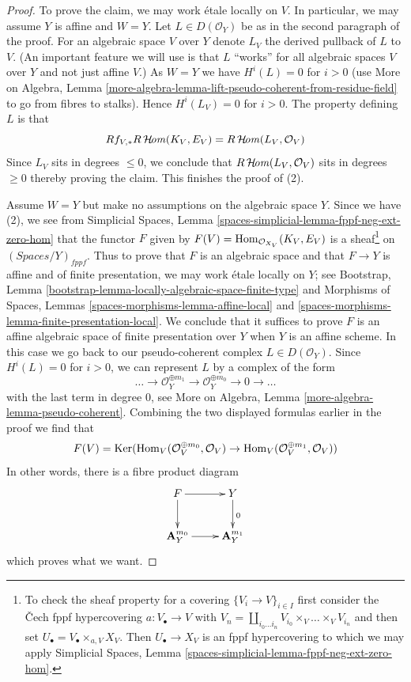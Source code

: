 \begin{proof}
\medskip\noindent
To prove the claim, we may work \'etale locally on $V$.
In particular, we may assume $Y$ is affine and $W = Y$.
Let $L \in D(\mathcal{O}_Y)$ be as in the second paragraph of the proof.
For an algebraic space $V$ over $Y$ denote $L_V$ the derived pullback of
$L$ to $V$. (An important feature we will use is that $L$ ``works'' for all
algebraic spaces $V$ over $Y$ and not just affine $V$.)
As $W = Y$ we have $H^i(L) = 0$ for $i > 0$
(use More on Algebra, Lemma
\ref{more-algebra-lemma-lift-pseudo-coherent-from-residue-field}
to go from fibres to stalks). Hence $H^i(L_V) = 0$ for $i > 0$.
The property defining $L$ is that
$$
Rf_{V, *}R\mathop{\mathcal{H}\!\mathit{om}}\nolimits(K_V, E_V) = R\mathop{\mathcal{H}\!\mathit{om}}\nolimits(L_V, \mathcal{O}_V)
$$
Since $L_V$ sits in degrees $\leq 0$, we conclude that
$R\mathop{\mathcal{H}\!\mathit{om}}\nolimits(L_V, \mathcal{O}_V)$ sits in degrees $\geq 0$
thereby proving the claim. This finishes the proof of (2).

\medskip\noindent
Assume $W = Y$ but make no assumptions on the algebraic space $Y$.
Since we have (2), we see from
Simplicial Spaces, Lemma \ref{spaces-simplicial-lemma-fppf-neg-ext-zero-hom}
that the functor $F$ given by $F(V) = \mathop{\mathrm{Hom}}\nolimits_{\mathcal{O}_{X_V}}(K_V, E_V)$
is a sheaf\footnote{To check the sheaf property
for a covering $\{V_i \to V\}_{i \in I}$ first consider the
{\v C}ech fppf hypercovering $a : V_\bullet \to V$ with
$V_n = \coprod_{i_0 \ldots i_n} V_{i_0} \times_V \ldots \times_V V_{i_n}$
and then set $U_\bullet = V_\bullet \times_{a, V} X_V$. Then
$U_\bullet \to X_V$ is an fppf hypercovering to which we may
apply Simplicial Spaces, Lemma
\ref{spaces-simplicial-lemma-fppf-neg-ext-zero-hom}.}
on $(\textit{Spaces}/Y)_{fppf}$. Thus to prove that $F$
is an algebraic space and that $F \to Y$ is affine and of
finite presentation, we may work \'etale locally on $Y$; see
Bootstrap, Lemma \ref{bootstrap-lemma-locally-algebraic-space-finite-type}
and
Morphisms of Spaces, Lemmas \ref{spaces-morphisms-lemma-affine-local} and
\ref{spaces-morphisms-lemma-finite-presentation-local}. We conclude
that it suffices to prove $F$ is an affine algebraic space of
finite presentation over $Y$ when $Y$ is an affine scheme. In this
case we go back to our pseudo-coherent complex $L \in D(\mathcal{O}_Y)$.
Since $H^i(L) = 0$ for $i > 0$, we can represent $L$ by a complex
of the form
$$
\ldots \to \mathcal{O}_Y^{\oplus m_1} \to \mathcal{O}_Y^{\oplus m_0}
\to 0 \to \ldots
$$
with the last term in degree $0$, see More on Algebra, Lemma
\ref{more-algebra-lemma-pseudo-coherent}. Combining the two displayed formulas
earlier in the proof we find that
$$
F(V) =
\mathop{\mathrm{Ker}}(
\mathop{\mathrm{Hom}}\nolimits_V(\mathcal{O}_V^{\oplus m_0}, \mathcal{O}_V)
\to 
\mathop{\mathrm{Hom}}\nolimits_V(\mathcal{O}_V^{\oplus m_1}, \mathcal{O}_V)
)
$$
In other words, there is a fibre product diagram
$$
\xymatrix{
F \ar[d] \ar[r] & Y \ar[d]^0 \\
\mathbf{A}_Y^{m_0} \ar[r] & \mathbf{A}_Y^{m_1}
}
$$
which proves what we want.
\end{proof}

